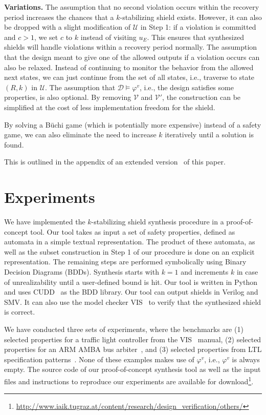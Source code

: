 \documentclass{llncs}
\newcommand{\buchi}{B\"uchi\xspace}
\newcommand{\design}{\mathcal{D}}
\newcommand{\specv}{\varphi^v}
\newif \ifextended
\begin{document}
\noindent
\textbf{Variations.}
The assumption that no second violation occurs within the recovery 
period increases the chances that a $k$-stabilizing shield exists.  
However, it can also be dropped with a slight 
modification of $\mathcal{U}$ in Step 1: if a violation is committed and 
$c > 1$, we set $c$ to $k$ instead of visiting $u_E$.  This ensures 
that synthesized shields will handle violations within a 
recovery period normally.  
The assumption that the design meant to give one of the allowed outputs 
if a violation occurs can also be relaxed.  Instead of continuing to 
monitor the behavior from the allowed next states, we can just continue 
from the set of all states, i.e., traverse to state $(R,k)$ in 
$\mathcal{U}$.  The assumption that $\design\models\specv$, i.e., the 
design satisfies some properties, is also optional.  By removing 
$\mathcal{V}$ and $\mathcal{V}'$, the construction can be 
simplified at the cost of less implementation freedom for the shield.

By solving a \buchi game (which is potentially more expensive) instead 
of a safety game, we can also eliminate the need to increase $k$ 
iteratively until a solution is found. 
\ifextended
This is outlined in Appendix~\ref{sec:app}.
\else
This is outlined in the appendix of an extended version~\cite{extended} 
of this paper.
\fi

\section{Experiments} 
\label{sec:exp}

We have implemented the $k$-stabilizing shield synthesis procedure in a 
proof-of-concept tool.  Our tool takes as input a set of safety 
properties, defined as automata in a simple textual representation. The 
product of these automata, as well as the subset construction in Step 1 
of our procedure is done on an explicit representation.  The remaining 
steps are performed symbolically using Binary Decision Diagrams (BDDs).  
Synthesis starts with $k=1$ and increments $k$ in case of 
unrealizability until a user-defined bound is hit.  Our tool is written 
in Python and uses CUDD~\cite{Somenz95} as the BDD library.  Our tool 
can output shields in Verilog and SMV. It can also use the model checker 
VIS~\cite{VIS96} to verify that the synthesized shield is correct.

We have conducted three sets of experiments, where the benchmarks are 
(1) selected properties for a traffic light controller from the 
VIS~\cite{VIS96} manual, (2) selected properties for an ARM AMBA bus 
arbiter~\cite{BloemJPPS12}, and (3) selected properties from LTL 
specification patterns~\cite{DwyerAC99}.  None of these examples makes 
use of $\specv$, i.e., $\specv$ is always empty. The source code of our 
proof-of-concept synthesis tool as well as the input files and 
instructions to reproduce our experiments are available for 
download\footnote{\scriptsize\url{ 
http://www.iaik.tugraz.at/content/research/design_verification/others/}
}.
\end{document}

